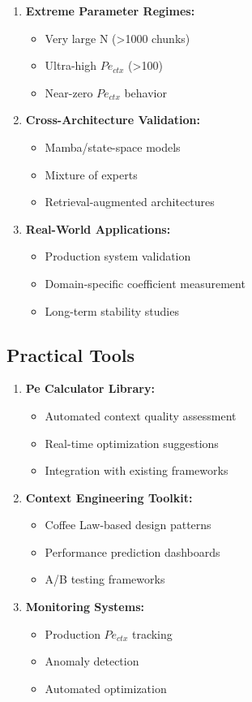 \documentclass[conference]{IEEEtran}
\begin{document}
\begin{enumerate}
\item \textbf{Extreme Parameter Regimes:}
   \begin{itemize}
   \item Very large N (>1000 chunks)
   \item Ultra-high $Pe_{ctx}$ (>100)
   \item Near-zero $Pe_{ctx}$ behavior
   \end{itemize}

\item \textbf{Cross-Architecture Validation:}
   \begin{itemize}
   \item Mamba/state-space models
   \item Mixture of experts
   \item Retrieval-augmented architectures
   \end{itemize}

\item \textbf{Real-World Applications:}
   \begin{itemize}
   \item Production system validation
   \item Domain-specific coefficient measurement
   \item Long-term stability studies
   \end{itemize}
\end{enumerate}

\subsection{Practical Tools}

\begin{enumerate}
\item \textbf{Pe Calculator Library:}
   \begin{itemize}
   \item Automated context quality assessment
   \item Real-time optimization suggestions
   \item Integration with existing frameworks
   \end{itemize}

\item \textbf{Context Engineering Toolkit:}
   \begin{itemize}
   \item Coffee Law-based design patterns
   \item Performance prediction dashboards
   \item A/B testing frameworks
   \end{itemize}

\item \textbf{Monitoring Systems:}
   \begin{itemize}
   \item Production $Pe_{ctx}$ tracking
   \item Anomaly detection
   \item Automated optimization
   \end{itemize}
\end{enumerate}
\end{document}
